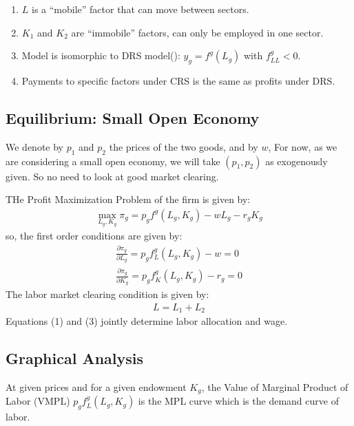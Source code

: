 \begin{remark}
    \begin{enumerate}
        \item $L$ is a ``mobile'' factor that can move between sectors.
        \item $K_1$ and $K_2$ are  ``immobile'' factors, can only be employed in one sector.
        \item Model is isomorphic to DRS model(\cite{dornbusch1977comparative}): $y_g = f^g(L_g)$ with $f_{LL}^g < 0$.
        \item Payments to specific factors under CRS is the same as profits under DRS.
    \end{enumerate}
\end{remark}

\subsection{Equilibrium: Small Open Economy}
We denote by $p_1$ and $p_2$ the prices of the two goods, and by $w$,
For now, as we are considering a small open economy, we will take $(p_1, p_2)$ as exogenously given.
So no need to look at good market clearing.

THe Profit Maximization Problem of the firm is given by:
\begin{gather*}
    \max_{L_g, K_g} \pi_g = p_g f^g(L_g, K_g) - wL_g - r_gK_g
\end{gather*}
so, the first order conditions are given by:
\begin{gather*}
    \frac{\partial \pi_g}{\partial L_g} = p_g f_{L}^g(L_g, K_g) - w = 0 \tag{1}\\
    \frac{\partial \pi_g}{\partial K_g} = p_g f_{K}^g(L_g, K_g) - r_g = 0 \tag{2}
\end{gather*}
The labor market clearing condition is given by:
\begin{gather*}
    L = L_1 + L_2 \tag{3}
\end{gather*}
Equations (1) and (3) jointly determine labor allocation and wage.

\subsection{Graphical Analysis}
At given prices and for a given endowment $K_g$, the Value of Marginal Product of Labor (VMPL) $p_g f_L^g(L_g, K_g)$ is the MPL curve
which is the demand curve of labor.


